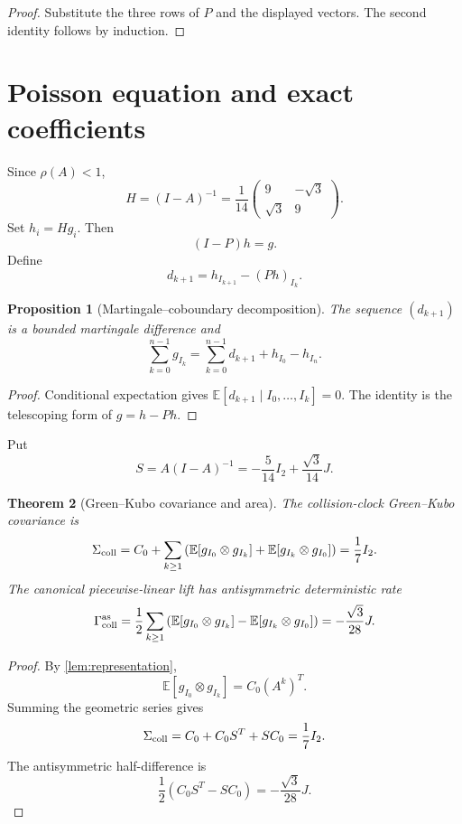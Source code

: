 \documentclass[11pt,reqno]{amsart}
\newtheorem{theorem}{Theorem}[section]
\newtheorem{proposition}[theorem]{Proposition}
\theoremstyle{definition}
\theoremstyle{remark}
\newcommand{\E}{\mathbb E}
\begin{document}
\begin{proof}
Substitute the three rows of $P$ and the displayed vectors.  The second
identity follows by induction.
\end{proof}

\section{Poisson equation and exact coefficients}\label{sec:poisson}

Since $\rho(A)<1$,
\[
 H=(I-A)^{-1}
 =\frac1{14}
 \begin{pmatrix}
 9&-\sqrt3\\
 \sqrt3&9
 \end{pmatrix}.
\]
Set $h_i=Hg_i$.  Then
\[
 (I-P)h=g.
\]
Define
\[
 d_{k+1}=h_{I_{k+1}}-(Ph)_{I_k}.
\]

\begin{proposition}[Martingale--coboundary decomposition]\label{prop:gordin}
The sequence $(d_{k+1})$ is a bounded martingale difference and
\[
 \sum_{k=0}^{n-1}g_{I_k}
 =
 \sum_{k=0}^{n-1}d_{k+1}+h_{I_0}-h_{I_n}.
\]
\end{proposition}

\begin{proof}
Conditional expectation gives
$\E[d_{k+1}\mid I_0,\ldots,I_k]=0$.  The identity is the telescoping form of
$g=h-Ph$.
\end{proof}

Put
\[
 S=A(I-A)^{-1}
 =-\frac5{14}I_2+\frac{\sqrt3}{14}J.
\]

\begin{theorem}[Green--Kubo covariance and area]\label{thm:coefficients}
The collision-clock Green--Kubo covariance is
\[
 \Sigma_{\rm coll}
 =
 C_0+\sum_{k\ge1}
 \left(
 \E[g_{I_0}\otimes g_{I_k}]
 +\E[g_{I_k}\otimes g_{I_0}]
 \right)
 =\frac17I_2.
\]
The canonical piecewise-linear lift has antisymmetric deterministic rate
\[
 \Gamma_{\rm coll}^{\rm as}
 =
 \frac12\sum_{k\ge1}
 \left(
 \E[g_{I_0}\otimes g_{I_k}]
 -\E[g_{I_k}\otimes g_{I_0}]
 \right)
 =-\frac{\sqrt3}{28}J.
\]
\end{theorem}

\begin{proof}
By \cref{lem:representation},
\[
 \E[g_{I_0}\otimes g_{I_k}]
 =C_0(A^k)^T.
\]
Summing the geometric series gives
\[
 \Sigma_{\rm coll}
 =C_0+C_0S^T+SC_0
 =\frac17I_2.
\]
The antisymmetric half-difference is
\[
 \frac12(C_0S^T-SC_0)
 =-\frac{\sqrt3}{28}J.
\]
\end{proof}
\end{document}
